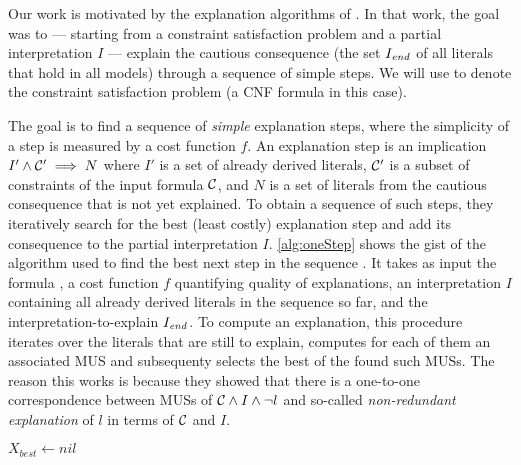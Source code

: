 Our work is motivated by the  explanation algorithms of \citet{ecai/BogaertsGCG20}. 
In that work, the goal was to --- starting from a constraint satisfaction problem and a partial interpretation $I$ --- explain the cautious consequence (the set $I_\mathit{end} $ of all literals that hold in all models) through a sequence of simple steps. 
We will use \formulac to denote the constraint satisfaction problem (a CNF formula in this case). %

The goal is to find a sequence of \textit{simple} explanation steps, where the simplicity of a step is measured by a cost function $f$. 
An explanation step is an implication $I' \wedge \mathcal{C} ' \implies N$ where $I'$ is a set of already derived literals, $\mathcal{C} '$ is a subset of constraints of the input formula $\mathcal{C} $, and $N$ is a set of literals from the cautious consequence that is not yet explained.
To obtain a sequence of such steps, they iteratively search for the best (least costly) explanation step and add its consequence to the partial interpretation $I$.
\cref{alg:oneStep} shows the gist of the algorithm used to find the best next step in the sequence \cite{ecai/BogaertsGCG20}.
It takes as input the formula \formulac, a cost function $f$ quantifying quality of explanations, an interpretation $I$ containing all already derived literals in the sequence so far, and the interpretation-to-explain $I_\mathit{end} $. 
To compute an explanation, this procedure iterates over the literals that are still to explain, computes for each of them an associated MUS and subsequenty selects the best of the found such MUSs.  
The reason this works is because they showed that there is a one-to-one correspondence between MUSs of $\mathcal{C}  \land I \land \neg l$ and so-called \emph{non-redundant explanation} of $l$ in terms of $\mathcal{C} $ and $I$. 


\newcommand\onestep{\ensuremath{\call{explain-One-Step}}\xspace}

\begin{algorithm}[t]
  \caption{$\onestep(\formulac,f,I,\Iend)$}
  \label{alg:oneStep}
$X_{best} \gets \mathit{nil}$\;
\end{algorithm}


